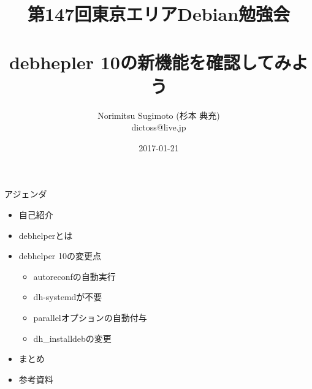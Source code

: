 \title{第147回東京エリアDebian勉強会 \\　\\debhepler 10の新機能を確認してみよう}
\subtitle{}
\author{Norimitsu Sugimoto (杉本 典充) \\dictoss@live.jp}
\date{2017-01-21}



\frame{\titlepage{}}


\begin{frame}{アジェンダ}
  \begin{itemize}
  \item 自己紹介
  \item debhelperとは
  \item debhelper 10の変更点
    \begin{itemize}
    \item autoreconfの自動実行
    \item dh-systemdが不要
    \item parallelオプションの自動付与
    \item dh\_installdebの変更
    \end{itemize}
  \item まとめ
  \item 参考資料
  \end{itemize}
\end{frame}



